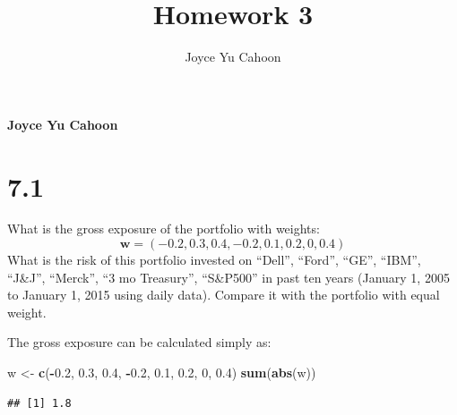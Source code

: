 \documentclass[11pt,]{article}
\title{Homework 3  }
\author{\Large Joyce Yu Cahoon\vspace{0.05in} \newline\normalsize\emph{}  }
\date{}
\newcommand*{\authorfont}{\fontfamily{phv}\selectfont}
\newenvironment{Shaded}{\begin{snugshade}}{\end{snugshade}}
\newcommand{\KeywordTok}[1]{\textcolor[rgb]{0.13,0.29,0.53}{\textbf{#1}}}
\newcommand{\DecValTok}[1]{\textcolor[rgb]{0.00,0.00,0.81}{#1}}
\newcommand{\FloatTok}[1]{\textcolor[rgb]{0.00,0.00,0.81}{#1}}
\newcommand{\StringTok}[1]{\textcolor[rgb]{0.31,0.60,0.02}{#1}}
\newcommand{\OperatorTok}[1]{\textcolor[rgb]{0.81,0.36,0.00}{\textbf{#1}}}
\newcommand{\NormalTok}[1]{#1}
\renewenvironment{quote}{\begin{shaded*}}{\end{shaded*}}
\newcommand{\V}[1]{{\bm{{#1}}}}
\begin{document}
%

{%
\setlength{\parindent}{0pt}
\thispagestyle{plain}
{\fontsize{18}{20}\selectfont\raggedright 
\maketitle  %

}

{
  \vskip 13.5pt\relax \normalsize\fontsize{11}{12} 
  \textbf{\authorfont Joyce Yu Cahoon} \hskip 15pt \emph{\small }   
  
}

}






\vskip 6.5pt


\noindent  \section{7.1}\label{section}

What is the gross exposure of the portfolio with weights: \[
\V{w} = (-0.2, 0.3, 0.4, -0.2, 0.1, 0.2, 0, 0.4)
\] What is the risk of this portfolio invested on ``Dell'', ``Ford'',
``GE'', ``IBM'', ``J\&J'', ``Merck'', ``3 mo Treasury'', ``S\&P500'' in
past ten years (January 1, 2005 to January 1, 2015 using daily data).
Compare it with the portfolio with equal weight.

\begin{quote}
The gross exposure can be calculated simply as:
\end{quote}

\begin{Shaded}
\begin{Highlighting}[]
\NormalTok{w <-}\StringTok{ }\KeywordTok{c}\NormalTok{(}\OperatorTok{-}\FloatTok{0.2}\NormalTok{, }\FloatTok{0.3}\NormalTok{, }\FloatTok{0.4}\NormalTok{, }\OperatorTok{-}\FloatTok{0.2}\NormalTok{, }\FloatTok{0.1}\NormalTok{, }\FloatTok{0.2}\NormalTok{, }\DecValTok{0}\NormalTok{, }\FloatTok{0.4}\NormalTok{)}
\KeywordTok{sum}\NormalTok{(}\KeywordTok{abs}\NormalTok{(w))}
\end{Highlighting}
\end{Shaded}

\begin{verbatim}
## [1] 1.8
\end{verbatim}
\end{document}
